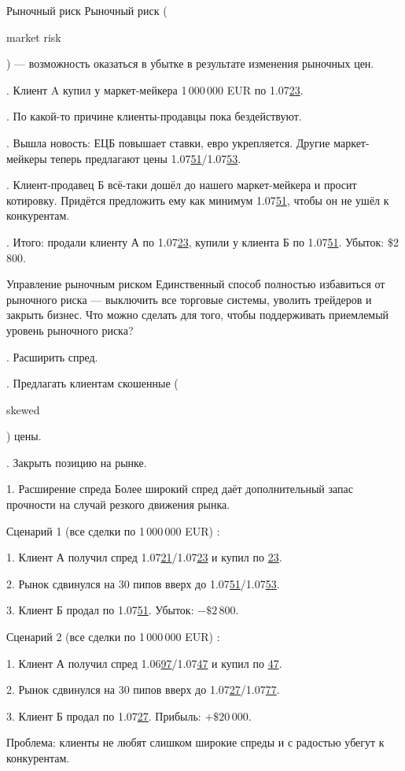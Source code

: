 \documentclass{beamer}
\newcommand{\en}[1]{\begin{otherlanguage}{english}#1\end{otherlanguage}}
\begin{document}
\begin{frame}{Рыночный риск}
\justify
\alert{Рыночный риск} (\en{market risk}) --- возможность оказаться в убытке в результате изменения рыночных цен.

. Клиент A купил у маркет-мейкера 1\,000\,000 EUR по 1.07\underline{23}.

. По какой-то причине клиенты-продавцы пока бездействуют.

. Вышла новость: ЕЦБ повышает ставки, евро укрепляется. Другие маркет-мейкеры теперь предлагают цены 1.07\underline{51}/1.07\underline{53}.

. Клиент-продавец Б всё-таки дошёл до нашего маркет-мейкера и просит котировку.
Придётся предложить ему как минимум 1.07\underline{51}, чтобы он не ушёл к конкурентам.

. Итого: продали клиенту А по 1.07\underline{23}, купили у клиента Б по
1.07\underline{51}. Убыток: \$2\,800.
\end{frame}



\begin{frame}{Управление рыночным риском}
\justify
Единственный способ полностью избавиться от рыночного риска --- выключить 
все торговые системы, уволить трейдеров и закрыть бизнес. Что можно сделать
для того, чтобы поддерживать приемлемый уровень рыночного риска?

. Расширить спред.

. Предлагать клиентам скошенные (\en{skewed}) цены.

. Закрыть позицию на рынке.
\end{frame}



\begin{frame}{1. Расширение спреда}
\justify
Более широкий спред даёт дополнительный запас прочности на случай резкого
движения рынка.

\justify
Сценарий 1 (все сделки по 1\,000\,000 EUR) :

1. Клиент А получил спред 1.07\underline{21}/1.07\underline{23} и купил по \underline{23}.

2. Рынок сдвинулся на 30 пипов вверх до 1.07\underline{51}/1.07\underline{53}.

3. Клиент Б продал по 1.07\underline{51}. Убыток: $-\$2\,800$.

\justify
Сценарий 2 (все сделки по 1\,000\,000 EUR) :

1. Клиент А получил спред 1.06\underline{97}/1.07\underline{47} и купил по \underline{47}.

2. Рынок сдвинулся на 30 пипов вверх до 1.07\underline{27}/1.07\underline{77}.

3. Клиент Б продал по 1.07\underline{27}. Прибыль: $+\$20\,000$.

\justify
Проблема: клиенты не любят слишком широкие спреды и с радостью убегут к 
конкурентам.
\end{frame}
\end{document}
